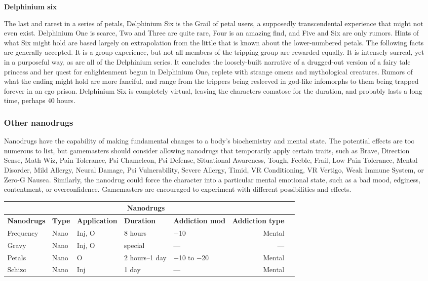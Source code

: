 \textbf{Delphinium six}

The last and rarest in a series of petals, Delphinium Six is the Grail of petal users, a supposedly transcendental experience that might not even exist. Delphinium One is scarce, Two and Three are quite rare, Four is an amazing find, and Five and Six are only rumors. Hints of what Six might hold are based largely on extrapolation from the little that is known about the lower-numbered petals. The following facts are generally accepted. It is a group experience, but not all members of the tripping group are rewarded equally. It is intensely surreal, yet in a purposeful way, as are all of the Delphinium series. It concludes the loosely-built narrative of a drugged-out version of a fairy tale princess and her quest for enlightenment begun in Delphinium One, replete with strange omens and mythological creatures. Rumors of what the ending might hold are more fanciful, and range from the trippers being resleeved in god-like infomorphs to them being trapped forever in an ego prison. Delphinium Six is completely virtual, leaving the characters comatose for the duration, and probably lasts a long time, perhaps 40 hours.

\subsubsection{Other nanodrugs}

Nanodrugs have the capability of making fundamental changes to a body’s biochemistry and mental state. The potential effects are too numerous to list, but gamemasters should consider allowing nanodrugs that temporarily apply certain traits, such as Brave, Direction Sense, Math Wiz, Pain Tolerance, Psi Chameleon, Psi Defense, Situational Awareness, Tough, Feeble, Frail, Low Pain Tolerance, Mental Disorder, Mild Allergy, Neural Damage, Psi Vulnerability, Severe Allergy, Timid, VR Conditioning, VR Vertigo, Weak Immune System, or Zero-G Nausea. Similarly, the nanodrug could force the character into a particular mental emotional state, such as a bad mood, edginess, contentment, or overconfidence. Gamemasters are encouraged to experiment with different possibilities and effects.

\hspace{1cm}

\begin{tabular}{|l|l|l|l|l|r|l|}
\hline
\multicolumn{6}{|c|}{\textbf{Nanodrugs}}			\\
\hline
\textbf{Nanodrugs}	& \textbf{Type}	& \textbf{Application}	& \textbf{Duration}	& \textbf{Addiction mod}	& \textbf{Addiction type} \\
\hline
Frequency			& Nano			& Inj, O				& 8 hours 		& $-$10						& Mental \\
\hline
Gravy			& Nano			& Inj, O				& special 		&  --- 						&  ---  \\
\hline
Petals			& Nano			& O					& 2 hours--1 day	& +10 to $-$20					& Mental \\
\hline
Schizo			& Nano			& Inj				& 1 day			&  --- 						& Mental \\
\hline
\end{tabular}
\label{tab:nanodrugs}


